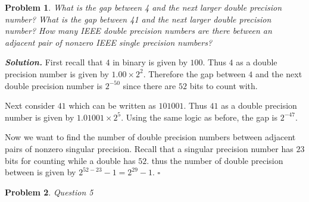 \documentclass[12pt]{report}
\newtheorem{problem}{Problem}
\newenvironment{solution}[1][\it{Solution}]{\textbf{#1. } }{$\square$}
\begin{document}
\newpage



\begin{problem}
    What is the gap between 4 and the next larger double precision number? What is the
gap between 41 and the next larger double precision number? How many IEEE double
precision numbers are there between an adjacent pair of nonzero IEEE single precision
numbers?
\end{problem}

\begin{solution}
    \noindent
    First recall that $4$ in binary is given by $100$. Thus $4$ as a double precision number is given by $1.00 \times 2^2$. Therefore the gap between $4$ and the next double precision number is $2^{-50}$ since there are $52$ bits to count with. 
    
    \noindent
    Next consider $41$ which can be written as $101001$. Thus $41$ as a double precision number is given by $1.01001 \times 2^5$. Using the same logic as before, the gap is $2^{-47}$.

    \noindent
    Now we want to find the number of double precision numbers between adjacent pairs of nonzero singular precision. Recall that a singular precision number has $23$ bits for counting while a double has $52$. thus the number of double precision between is given by $2^{52 - 23} - 1 = 2^{29} - 1$.   
\end{solution}

\newpage



\begin{problem}
    Question 5
\end{problem}
\end{document}
